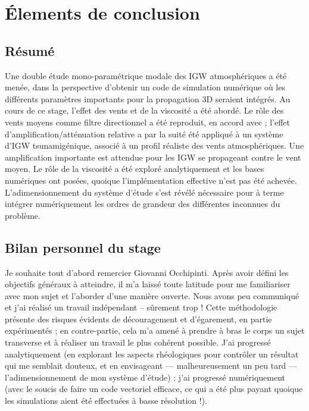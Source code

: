 \section{Élements de conclusion}

\subsection{Résumé}
Une double étude mono-paramétrique modale des IGW atmosphériques a été menée, dans la perspective d'obtenir un code de simulation numérique où les différents paramètres importants pour la propagation 3D seraient intégrés. Au cours de ce stage, l'effet des vents et de la viscosité a été abordé. Le rôle des vents moyens comme filtre directionnel a été reproduit, en accord avec \cite{Sun2007} ; l'effet d'amplification/atténuation relative a par la suité été appliqué à un système d'IGW tsunamigénique, associé à un profil réaliste des vents atmosphériques. Une amplification importante est attendue pour les IGW se propageant contre le vent moyen.
Le rôle de la viscosité a été exploré analytiquement et les bases numériques ont posées, quoique l'implémentation effective n'est pas été achevée. L'adimensionnement du système d'étude s'est révélé nécessaire pour à terme intégrer numériquement les ordres de grandeur des différentes inconnues du problème.

\subsection{Bilan personnel du stage}

Je souhaite tout d'abord remercier Giovanni Occhipinti. Après avoir défini les objectifs généraux à atteindre, il m'a laissé toute latitude pour me familiariser avec mon sujet et l'aborder d'une manière ouverte. Nous avons peu communiqué et j'ai réalisé un travail indépendant -- sûrement trop ! Cette méthodologie présente des risques évidents de découragement et d'égarement, en partie expérimentés ; en contre-partie, cela m'a amené à prendre à bras le corps un sujet transverse et à réaliser un travail le plus cohérent possible. J'ai progressé analytiquement (en explorant les aspects rhéologiques pour contrôler un résultat qui me semblait douteux, et en envisageant — malheureusement un peu tard — l'adimensionnement de mon système d'étude) ; j'ai progressé numériquement (avec le soucis de faire un code vectoriel efficace, ce qui a été plus payant quoique les simulations aient été effectuées à basse résolution !).

